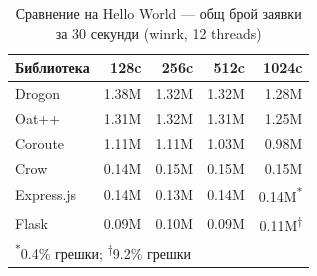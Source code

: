 \begin{table}[H]
\centering
\caption{Сравнение на Hello World --- общ брой заявки за 30 секунди (winrk, 12 threads)}
\label{tab:hello_world_comparison}
\begin{tabular}{|l|r|r|r|r|}
\hline
\textbf{Библиотека} & \textbf{128c} & \textbf{256c} & \textbf{512c} & \textbf{1024c} \\
\hline
Drogon & 1.38M & 1.32M & 1.32M & 1.28M \\
Oat++ & 1.31M & 1.32M & 1.31M & 1.25M \\
Coroute & 1.11M & 1.11M & 1.03M & 0.98M \\
Crow & 0.14M & 0.15M & 0.15M & 0.15M \\
Express.js & 0.14M & 0.13M & 0.14M & 0.14M\textsuperscript{*} \\
Flask & 0.09M & 0.10M & 0.09M & 0.11M\textsuperscript{†} \\
\hline
\multicolumn{5}{l}{\rule{0pt}{3ex}\textsuperscript{*}\footnotesize 0.4\% грешки; \textsuperscript{†}\footnotesize 9.2\% грешки} \\
\end{tabular}
\end{table}

